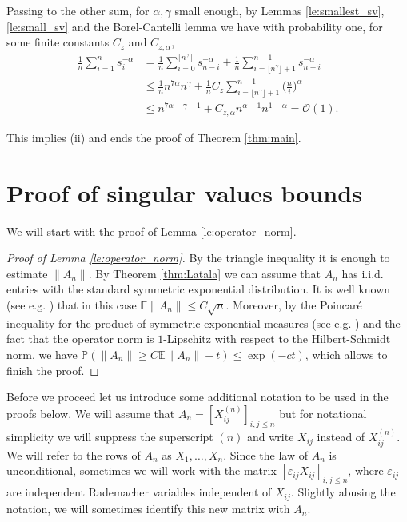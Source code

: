 \documentclass[12pt,reqno]{amsart}
\begin{document}
Passing to the other sum, for $\alpha, \gamma$ small enough, by Lemmas
\ref{le:smallest_sv}, \ref{le:small_sv} and the Borel-Cantelli lemma we have
with probability one, for some finite constants $C_{z}$ and
$C_{z,\alpha}$,
\begin{align*}
  \frac{1}{n} \sum_{i=1}^n s_{i}^{-\alpha} &= \frac{1}{n}\sum_{i = 0}^{\lfloor
    n^\gamma\rfloor } s_{n-i}^{-\alpha}   + \frac{1}{n} \sum_{i = \lfloor n^\gamma\rfloor +1}^{n-1} s_{n-i}^{-\alpha}\\
  &\le \frac{1}{n}n^{7\alpha} n^{\gamma}   + \frac{1}{n}C_{z} \sum_{i=\lfloor n^\gamma\rfloor +1}^{n-1}   \Big(\frac{n}{i}\Big)^\alpha \\
  &\le n^{7\alpha + \gamma - 1} + C_{z,\alpha} n^{\alpha - 1}
  n^{1-\alpha} = \mathcal{O}(1).
\end{align*}

This implies (ii) and ends the proof of Theorem \ref{thm:main}.

\section{Proof of singular values bounds}\label{sec:proofs_of_lemmas}

We will start with the proof of Lemma \ref{le:operator_norm}.

\begin{proof}[Proof of Lemma \ref{le:operator_norm}] By the triangle
  inequality it is enough to estimate $\|A_n\|$. By Theorem \ref{thm:Latala}
  we can assume that $A_n$ has i.i.d. entries with the standard symmetric
  exponential distribution. It is well known (see e.g.
  \cite{LatalaMatrixNorm}) that in this case ${\mathbb{E}}\|A_n\| \le C\sqrt{n}$.
  Moreover, by the Poincar\'e inequality for the product of symmetric
  exponential measures (see e.g. \cite{logSob}) and the fact that the operator
  norm is $1$-Lipschitz with respect to the Hilbert-Schmidt norm, we have
  ${\mathbb{P}}(\|A_n\| \ge C{\mathbb{E}}\|A_n\| + t) \le \exp(-ct)$, which allows to finish the
  proof.
\end{proof}

Before we proceed let us introduce some additional notation to be used in the
proofs below. We will assume that $A_n= [X_{ij}^{{(n)}}]_{i,j\le n}$ but for
notational simplicity we will suppress the superscript ${{(n)}}$ and write
$X_{ij}$ instead of $X_{ij}^{{(n)}}$. We will refer to the rows of $A_n$ as
$X_1,\ldots,X_n$. Since the law of $A_n$ is unconditional, sometimes we will
work with the matrix $[\varepsilon_{ij}X_{ij}]_{i,j\le n}$, where
$\varepsilon_{ij}$ are independent Rademacher variables independent of
$X_{ij}$. Slightly abusing the notation, we will sometimes identify this new
matrix with $A_n$.
\end{document}
